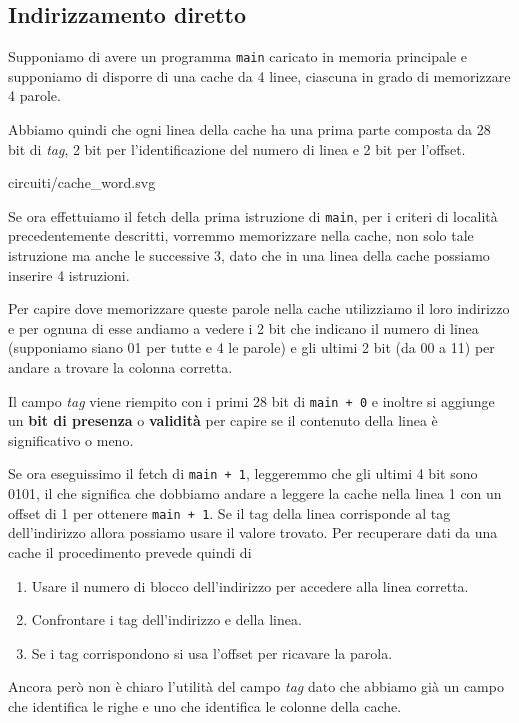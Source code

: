 \subsection{Indirizzamento diretto}
Supponiamo di avere un programma \verb|main| caricato in memoria principale e supponiamo di
disporre di una cache da 4 linee, ciascuna in grado di memorizzare 4 parole.

Abbiamo quindi che ogni linea della cache ha una prima parte composta da 28 bit di \emph{tag}, 2
bit per l'identificazione del numero di linea e 2 bit per l'offset.
\begin{center}
	 {circuiti/cache_word.svg}
\end{center}

Se ora effettuiamo il fetch della prima istruzione di \verb|main|, per i criteri di località
precedentemente descritti, vorremmo memorizzare nella cache, non solo tale istruzione ma anche le
successive 3, dato che in una linea della cache possiamo inserire 4 istruzioni.

Per capire dove memorizzare queste parole nella cache utilizziamo il loro indirizzo e per ognuna di
esse andiamo a vedere i 2 bit che indicano il numero di linea (supponiamo siano 01 per tutte e 4
le parole) e gli ultimi 2 bit (da 00 a 11) per andare a trovare la colonna corretta.
\begin{center}
	
\end{center}
Il campo \emph{tag} viene riempito con i primi 28 bit di \verb|main + 0| e inoltre si aggiunge un
\textbf{bit di presenza} o \textbf{validità} per capire se il contenuto della linea è significativo
o meno.

Se ora eseguissimo il fetch di \verb|main + 1|, leggeremmo che gli ultimi 4 bit sono 0101, il che
significa che dobbiamo andare a leggere la cache nella linea 1 con un offset di 1 per ottenere
\verb|main + 1|. Se il tag della linea corrisponde al tag dell'indirizzo allora possiamo usare il
valore trovato. Per recuperare dati da una cache il procedimento prevede quindi di
\begin{enumerate}
	\item Usare il numero di blocco dell'indirizzo per accedere alla linea corretta.
	\item Confrontare i tag dell'indirizzo e della linea.
	\item Se i tag corrispondono si usa l'offset per ricavare la parola.
\end{enumerate}
Ancora però non è chiaro l'utilità del campo \emph{tag} dato che abbiamo già un campo che
identifica le righe e uno che identifica le colonne della cache.

